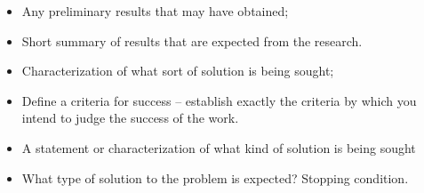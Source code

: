 \begin{itemize}
  \item Any preliminary results that may have obtained;
  \item Short summary of results that are expected from the research.
  \item Characterization of what sort of solution is being sought;
  \item Define a criteria for success -- establish exactly the criteria by
  which you intend to judge the success of the work.
  \item A statement or characterization of what kind of solution is being sought
  \item What type of solution to the problem is expected? Stopping condition.   
\end{itemize}
